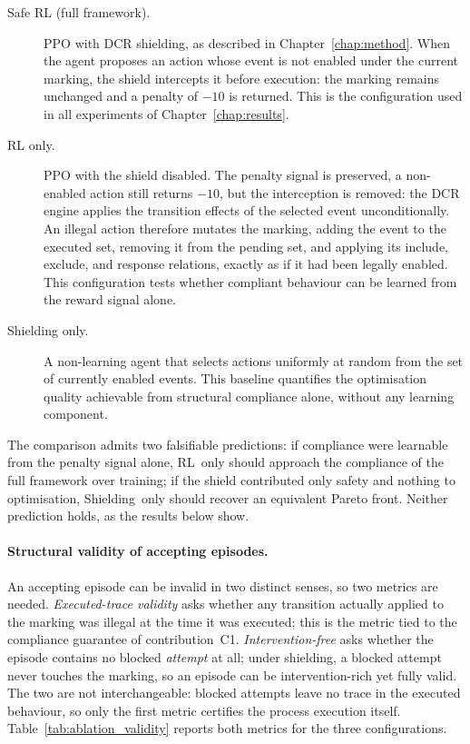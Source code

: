 \begin{description}
    \item[Safe \ac{RL} (full framework).]
    \ac{PPO} with \ac{DCR} shielding, as described in
    Chapter~\ref{chap:method}. When the agent proposes an action whose
    event is not enabled under the current marking, the shield
    intercepts it before execution: the marking remains unchanged and a
    penalty of $-10$ is returned. This is the configuration used in all
    experiments of Chapter~\ref{chap:results}.

    \item[\ac{RL} only.]
    \ac{PPO} with the shield disabled. The penalty signal is preserved,
    a non-enabled action still returns $-10$, but the interception is
    removed: the \ac{DCR} engine applies the transition effects of the
    selected event unconditionally. An illegal action therefore mutates
    the marking, adding the event to the executed set, removing it from
    the pending set, and applying its include, exclude, and response
    relations, exactly as if it had been legally enabled. This
    configuration tests whether compliant behaviour can be learned from
    the reward signal alone.

    \item[Shielding only.]
    A non-learning agent that selects actions uniformly at random from
    the set of currently enabled events. This baseline quantifies the
    optimisation quality achievable from structural compliance alone,
    without any learning component.
\end{description}

The comparison admits two falsifiable predictions: if compliance were
learnable from the penalty signal alone, \ac{RL}~only should approach
the compliance of the full framework over training; if the shield
contributed only safety and nothing to optimisation, Shielding~only
should recover an equivalent Pareto front. Neither prediction holds, as
the results below show.

\paragraph{Structural validity of accepting episodes.}
An accepting episode can be invalid in two distinct senses, so two
metrics are needed. \emph{Executed-trace validity} asks whether any
transition actually applied to the marking was illegal at the time it
was executed; this is the metric tied to the compliance guarantee of
contribution~C1. \emph{Intervention-free} asks whether the episode
contains no blocked \emph{attempt} at all; under shielding, a blocked
attempt never touches the marking, so an episode can be intervention-rich
yet fully valid. The two are not interchangeable: blocked attempts leave
no trace in the executed behaviour, so only the first metric certifies
the process execution itself. Table~\ref{tab:ablation_validity} reports
both metrics for the three configurations.

